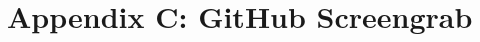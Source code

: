  	     \chapter{Appendix C: GitHub Screengrab}
     \vspace{-15mm}
     \begin{figure}[!htb]
     \centering
       \label{fig:}
	\end{figure}
